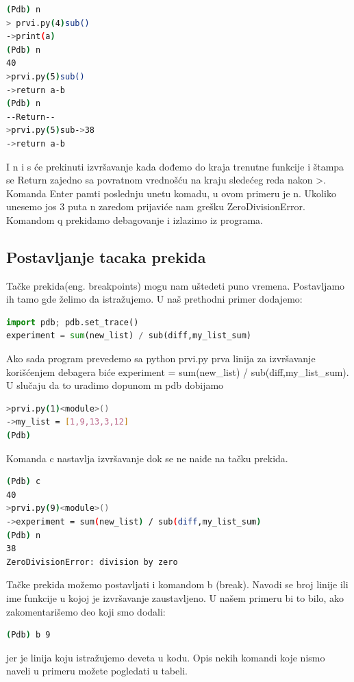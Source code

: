 \documentclass[a4paper]{article}
\begin{document}
\begin{lstlisting}[language = bash, caption={ispis}]
(Pdb) n
> prvi.py(4)sub()
->print(a)
(Pdb) n
40
>prvi.py(5)sub()
->return a-b
(Pdb) n
--Return--
>prvi.py(5)sub->38
->return a-b
\end{lstlisting}
I n i s će prekinuti izvršavanje kada dođemo do kraja trenutne funkcije i štampa se \textendash \textendash Return \textendash\textendash zajedno sa povratnom vrednošću na kraju sledećeg reda nakon \textendash>. Komanda Enter pamti poslednju unetu komadu, u ovom primeru je n. Ukoliko unesemo jos 3 puta n zaredom prijaviće nam grešku ZeroDivisionError. Komandom q prekidamo debagovanje i izlazimo iz programa.
\subsection{Postavljanje tacaka prekida}
Tačke prekida(eng. breakpoints) mogu nam uštedeti puno vremena. Postavljamo ih tamo gde želimo da istražujemo. U naš prethodni primer dodajemo:
\begin{lstlisting}[language = python, caption = {prvi.py}]
import pdb; pdb.set_trace()
experiment = sum(new_list) / sub(diff,my_list_sum)
\end{lstlisting}
Ako sada program prevedemo sa python prvi.py prva linija za izvršavanje korišćenjem debagera biće experiment = sum(new\_list) / sub(diff,my\_list\_sum). U slučaju da to uradimo dopunom \textendash m  pdb dobijamo
\begin{lstlisting}[language = bash, caption={ispis}]
>prvi.py(1)<module>()
->my_list = [1,9,13,3,12]
(Pdb)
\end{lstlisting}
Komanda c nastavlja izvršavanje dok se ne naiđe na tačku prekida.
\begin{lstlisting}[language = bash, caption={ispis}]
(Pdb) c
40
>prvi.py(9)<module>()
->experiment = sum(new_list) / sub(diff,my_list_sum)
(Pdb) n
38
ZeroDivisionError: division by zero
\end{lstlisting}
Tačke prekida možemo postavljati i komandom b (break). Navodi se broj linije ili ime funkcije u kojoj je izvršavanje zaustavljeno. U našem primeru bi to bilo, ako zakomentarišemo deo koji smo dodali:
\begin{lstlisting}[language = bash, caption={ispis}]
(Pdb) b 9 
\end{lstlisting}
jer je linija koju istražujemo deveta u kodu.
Opis nekih komandi koje nismo naveli u primeru možete pogledati u tabeli.
\end{document}
